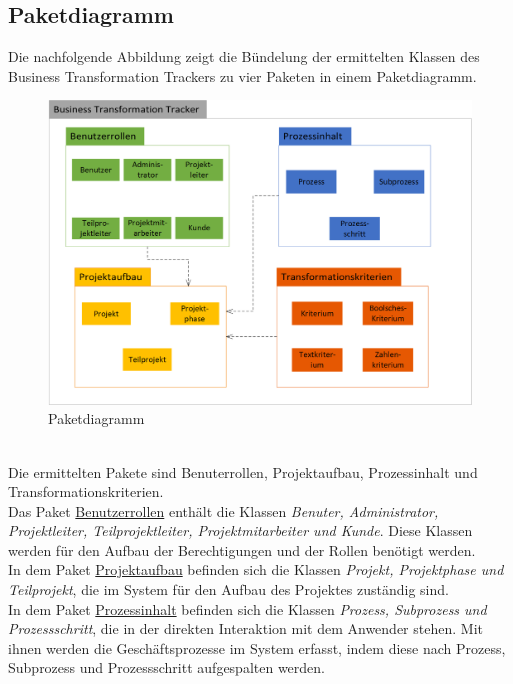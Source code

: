 \newpage
\subsection{Paketdiagramm}
Die nachfolgende Abbildung zeigt die Bündelung der ermittelten Klassen des Business Transformation Trackers zu vier Paketen in einem Paketdiagramm.\\
\begin{figure}[h!]
    \centering
    \includegraphics[scale=0.8]{./Bilder/Paketdiagramm.png}
    \caption[Paketdiagramm]{Paketdiagramm}
    \label{fig:Paketdiagramm}
\end{figure}
\\Die ermittelten Pakete sind \glqq{}Benuterrollen\grqq{}, \glqq{}Projektaufbau\grqq{}, \glqq{}Prozessinhalt\grqq{} und \glqq{}Transformationskriterien\grqq{}. 
\vspace{1em}
\\Das Paket \underline{Benutzerrollen} enthält die Klassen \emph{Benuter, Administrator, Projektleiter, Teilprojektleiter, Projektmitarbeiter und Kunde}. Diese Klassen werden für den Aufbau der Berechtigungen und der Rollen benötigt werden. 
\vspace{1em}
\\In dem Paket \underline{Projektaufbau} befinden sich die Klassen \emph{Projekt, Projektphase und Teilprojekt}, die im System für den Aufbau des Projektes zuständig sind. 
\vspace{1em}
\\In dem Paket \underline{Prozessinhalt} befinden sich die Klassen \emph{Prozess, Subprozess und Prozessschritt}, die in der direkten Interaktion mit dem Anwender stehen. Mit ihnen werden die Geschäftsprozesse im System erfasst, indem diese nach Prozess, Subprozess und Prozessschritt aufgespalten werden. 
